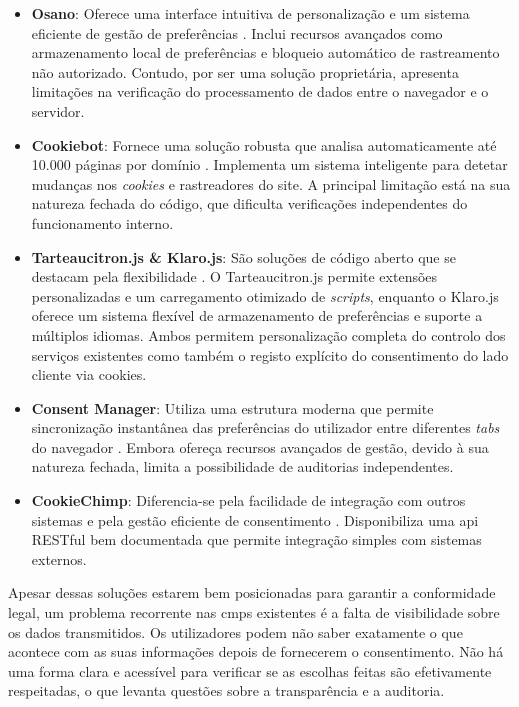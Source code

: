\begin{itemize}
    \item \textbf{Osano}: Oferece uma interface intuitiva de personalização e um sistema eficiente de gestão de preferências \cite{osano}. Inclui recursos avançados como armazenamento local de preferências e bloqueio automático de rastreamento não autorizado. Contudo, por ser uma solução proprietária, apresenta limitações na verificação do processamento de dados entre o navegador e o servidor.

    \item \textbf{Cookiebot}: Fornece uma solução robusta que analisa automaticamente até 10.000 páginas por domínio \cite{Cookiebot2024}. Implementa um sistema inteligente para detetar mudanças nos \textit{cookies} e rastreadores do site. A principal limitação 
    está na sua natureza fechada do código, que dificulta verificações independentes do funcionamento interno.

    \item \textbf{Tarteaucitron.js \& Klaro.js}: São soluções de código aberto que se destacam pela flexibilidade \cite{tarteaucitron}. O Tarteaucitron.js permite extensões personalizadas e um carregamento otimizado de \textit{scripts}, enquanto o Klaro.js oferece um sistema flexível de armazenamento de preferências e suporte a múltiplos idiomas. Ambos permitem personalização completa do controlo dos serviços existentes como também o registo explícito do consentimento do lado cliente via cookies.

    \item \textbf{Consent Manager}: Utiliza uma estrutura moderna que permite sincronização instantânea das preferências do utilizador entre diferentes \textit{tabs} do navegador \cite{ConsentManager2024}. Embora ofereça recursos avançados de gestão, devido à sua natureza fechada, limita a possibilidade de auditorias independentes.

    \item \textbf{CookieChimp}: Diferencia-se pela facilidade de integração com outros sistemas e pela gestão eficiente de consentimento \cite{CookieChimp2024}. Disponibiliza uma \acrshort{api} RESTful bem documentada que permite integração simples com sistemas externos.
\end{itemize}


Apesar dessas soluções estarem bem posicionadas para garantir a conformidade legal, um problema recorrente nas \acrshort{cmp}s existentes é a falta de visibilidade sobre os dados transmitidos. Os utilizadores podem não saber exatamente o que acontece com as suas informações depois de fornecerem o consentimento. Não há uma forma clara e acessível para verificar se as escolhas feitas são efetivamente respeitadas, o que levanta questões sobre a transparência e a auditoria.

